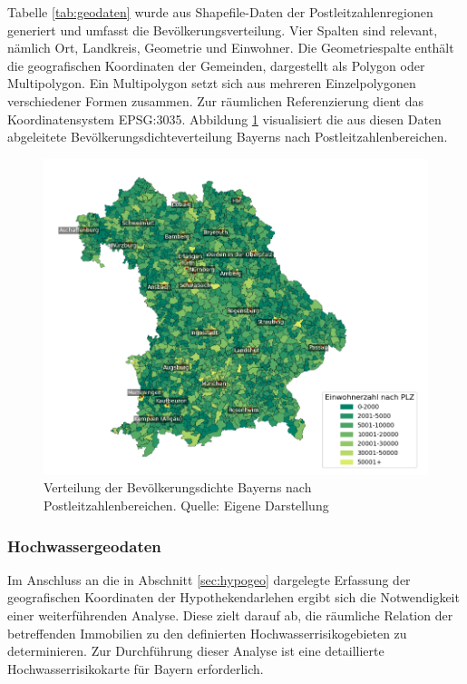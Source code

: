 Tabelle \ref{tab:geodaten} wurde aus Shapefile-Daten der Postleitzahlenregionen generiert und umfasst die Bevölkerungsverteilung. Vier Spalten sind relevant, nämlich Ort, Landkreis, Geometrie und Einwohner. Die Geometriespalte enthält die geografischen Koordinaten der Gemeinden, dargestellt als Polygon oder Multipolygon. Ein Multipolygon setzt sich aus mehreren Einzelpolygonen verschiedener Formen zusammen. Zur räumlichen Referenzierung dient das Koordinatensystem EPSG:3035. Abbildung \ref{fig:bevoelkerungsdichte} visualisiert die aus diesen Daten abgeleitete Bevölkerungsdichteverteilung Bayerns nach Postleitzahlenbereichen.

\begin{figure}[htbp]
    \centering
    \includegraphics[width=1\textwidth]{figures/Bayern_pop_plz.png}
    \caption{Verteilung der Bevölkerungsdichte Bayerns nach Postleitzahlenbereichen. Quelle: Eigene Darstellung}
    \label{fig:bevoelkerungsdichte}
\end{figure}
\FloatBarrier



\subsubsection{Hochwassergeodaten}\label{sec:hochgeo}

Im Anschluss an die in Abschnitt \ref{sec:hypogeo} dargelegte Erfassung der geografischen Koordinaten der Hypothekendarlehen ergibt sich die Notwendigkeit einer weiterführenden Analyse. Diese zielt darauf ab, die räumliche Relation der betreffenden Immobilien zu den definierten Hochwasserrisikogebieten zu determinieren. Zur Durchführung dieser Analyse ist eine detaillierte Hochwasserrisikokarte für Bayern erforderlich.

